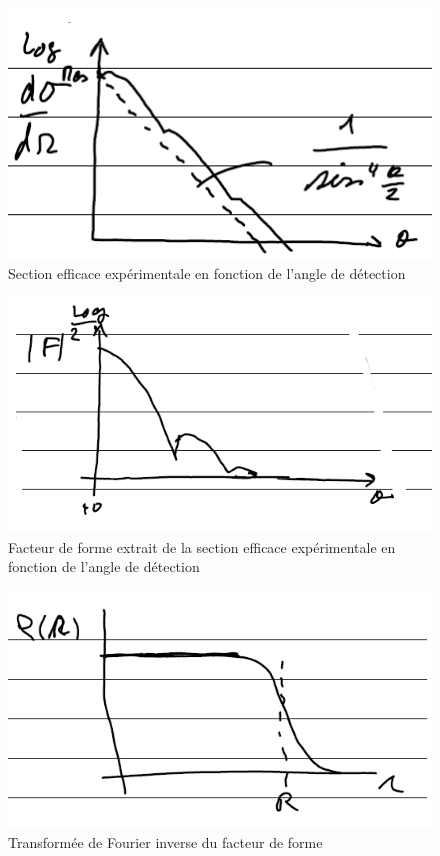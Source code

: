  \begin{figure}[H]
    \centering
    \includegraphics[scale=0.80]{Images4/graphe 1.PNG}
    \caption{Section efficace expérimentale en fonction de l'angle de détection}
    \label{fig:Section efficace expérimentale}
\end{figure}
\begin{figure}[H]
    \centering
    \includegraphics[scale=0.80]{Images4/graphe 2.PNG}
    \caption{Facteur de forme extrait de la section efficace expérimentale en fonction de l'angle de détection}
\end{figure}
 \begin{figure}[H]
    \centering
    \includegraphics[scale=0.80]{Images4/Fourier.PNG}
    \caption{Transformée de Fourier inverse du facteur de forme}
    \label{fig:Transformée de Fourier}
\end{figure}


